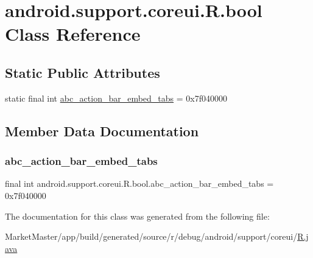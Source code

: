 \hypertarget{classandroid_1_1support_1_1coreui_1_1R_1_1bool}{}\section{android.\+support.\+coreui.\+R.\+bool Class Reference}
\label{classandroid_1_1support_1_1coreui_1_1R_1_1bool}
\subsection*{Static Public Attributes}
\begin{DoxyCompactItemize}
\item 
static final int \mbox{\hyperlink{classandroid_1_1support_1_1coreui_1_1R_1_1bool_a8f4c5f52b403fce26b4e70370bf2e2d3}{abc\+\_\+action\+\_\+bar\+\_\+embed\+\_\+tabs}} = 0x7f040000
\end{DoxyCompactItemize}


\subsection{Member Data Documentation}
\mbox{\label{classandroid_1_1support_1_1coreui_1_1R_1_1bool_a8f4c5f52b403fce26b4e70370bf2e2d3}} 
\subsubsection{\texorpdfstring{abc\+\_\+action\+\_\+bar\+\_\+embed\+\_\+tabs}{abc\_action\_bar\_embed\_tabs}}
{\footnotesize\ttfamily final int android.\+support.\+coreui.\+R.\+bool.\+abc\+\_\+action\+\_\+bar\+\_\+embed\+\_\+tabs = 0x7f040000\hspace{0.3cm}{\ttfamily [static]}}



The documentation for this class was generated from the following file\+:\begin{DoxyCompactItemize}
\item 
Market\+Master/app/build/generated/source/r/debug/android/support/coreui/\mbox{\hyperlink{debug_2android_2support_2coreui_2R_8java}{R.\+java}}\end{DoxyCompactItemize}
